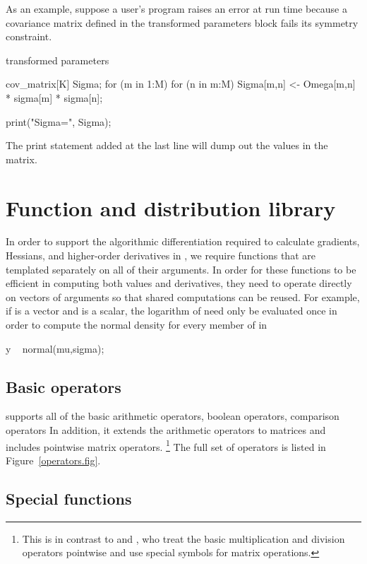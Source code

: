 \documentclass[article]{jss}
\begin{document}
As an example, suppose a user's program raises an error at run time
because a covariance matrix defined in the transformed parameters
block fails its symmetry constraint.  
%
\begin{Code}
transformed parameters {
  cov_matrix[K] Sigma;
  for (m in 1:M)
    for (n in m:M) 
      Sigma[m,n] <- Omega[m,n] * sigma[m] * sigma[n];

  print("Sigma=", Sigma);
}
\end{Code}
%
The print statement added at the last line will dump out the values in
the matrix. 


\section{Function and distribution library}\label{functions.section}

In order to support the algorithmic differentiation required to
calculate gradients, Hessians, and higher-order derivatives in
, we require  functions that are
templated separately on all of their arguments.  In order for these
functions to be efficient in computing both values and derivatives,
they need to operate directly on vectors of arguments so that shared
computations can be reused.  For example, if  is a vector and
 is a scalar, the logarithm of  need only be
evaluated once in order to compute the normal density for every member
of  in
%
\begin{Code}
y ~ normal(mu,sigma);
\end{Code}


\subsection{Basic operators}

 supports all of the basic  arithmetic
operators, boolean operators, comparison operators  In addition, it
extends the arithmetic operators to matrices and includes pointwise
matrix operators.%
%
\footnote{This is in contrast to  and , who
  treat the basic multiplication and division operators pointwise and
  use special symbols for matrix operations.}
%
The full set of operators is listed in Figure~\ref{operators.fig}.

\subsection{Special functions}
\end{document}
